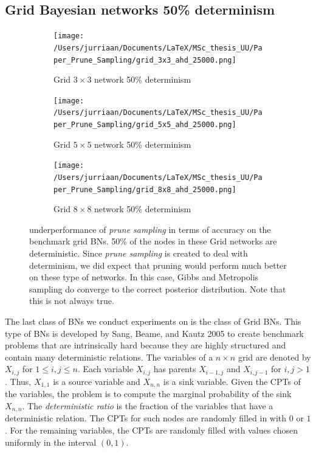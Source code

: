 \documentclass[a4paper, twoside, 11pt]{report}
\theoremstyle{plain}
\theoremstyle{definition}
\theoremstyle{remark}
\newcommand{\ps}{\textit{prune sampling }}
\begin{document}
\subsection{Grid Bayesian networks 50\% determinism}
\begin{figure}[b!]
\centering
\begin{subfigure}{0.49\textwidth}
\texttt{[image: /Users/jurriaan/Documents/LaTeX/MSc\_thesis\_UU/Paper\_Prune\_Sampling/grid\_3x3\_ahd\_25000.png]}
\caption{Grid $3 \times 3$ network 50\% determinism}%
\label{grid_3x3}%
\end{subfigure}\hfill%
\begin{subfigure}{0.49\textwidth}
\texttt{[image: /Users/jurriaan/Documents/LaTeX/MSc\_thesis\_UU/Paper\_Prune\_Sampling/grid\_5x5\_ahd\_25000.png]}
\caption{Grid $5 \times 5$ network 50\% determinism}%
\label{grid_5x5}%
\end{subfigure}
\begin{subfigure}{0.49\textwidth}
\texttt{[image: /Users/jurriaan/Documents/LaTeX/MSc\_thesis\_UU/Paper\_Prune\_Sampling/grid\_8x8\_ahd\_25000.png]}
\caption{Grid $8 \times 8$ network 50\% determinism}%
\label{grid_8x8}%
\end{subfigure}\hfill%
\caption{underperformance of \ps in terms of accuracy on the benchmark grid BNs. 50\% of the nodes in these Grid networks are deterministic. Since \ps is created to deal with determinism, we did expect that pruning would perform much better on these type of networks. In this case, Gibbs and Metropolis sampling do converge to the correct posterior distribution. Note that this is not always true.}
\label{results3}
\end{figure}
The last class of BNs we conduct experiments on is the class of Grid BNs. This type of BNs is developed by Sang, Beame, and Kautz 2005 \cite{sang2005solving} to create benchmark problems that are intrinsically hard because they are highly structured and contain many deterministic relations. The variables of a $n \times n$ grid are denoted by $X_{i,j}$ for $1 \leq i,j \leq n$. Each variable $X_{i,j}$ has parents $X_{i-1,j}$ and $X_{i,j-1}$ for $i,j>1$. Thus, $X_{1,1}$ is a source variable and $X_{n,n}$ is a sink variable. Given the CPTs of the variables, the problem is to compute the marginal probability of the sink $X_{n,n}$. The \textit{deterministic ratio} is the fraction of the variables that have a deterministic relation. The CPTs for such nodes are randomly filled in with $0$ or $1$. For the remaining variables, the CPTs are randomly filled with values chosen uniformly in the interval $(0, 1)$.\\
\end{document}
